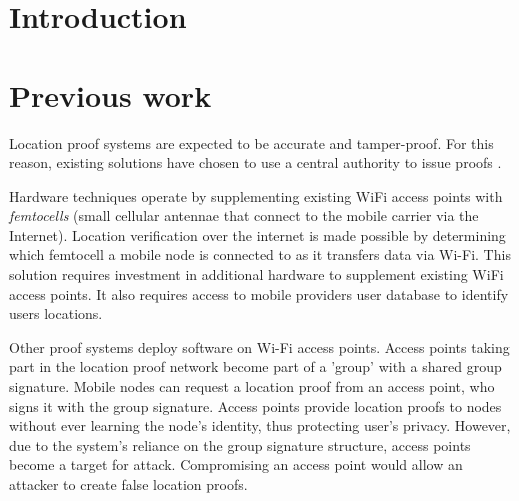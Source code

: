 \documentclass[12pt]{article}
\begin{document}
\maketitle

\begin{abstract}
\end{abstract}

\section{Introduction}

\section{Previous work}
Location proof systems are expected to be accurate and tamper-proof. For this reason, existing solutions have chosen to use a central authority to issue proofs \cite{brassil, luo, khan}.

Hardware techniques \cite{brassil} operate by supplementing existing WiFi access points with \textit{femtocells} (small cellular antennae that connect to the mobile carrier via the Internet). Location verification over the internet is made possible by determining which femtocell a mobile node is connected to as it transfers data via Wi-Fi. This solution requires investment in additional hardware to supplement existing WiFi access points. It also requires access to mobile providers user database to identify users locations.

Other proof systems \cite{luo} deploy software on Wi-Fi access points. Access points taking part in the location proof network become part of a 'group' with a shared group signature. Mobile nodes can request a location proof from an access point, who signs it with the group signature. Access points provide location proofs to nodes without ever learning the node's identity, thus protecting user's privacy. However, due to the system’s reliance on the group signature structure, access points become a target for attack. Compromising an access point would allow an attacker to create false location proofs.
\end{document}
